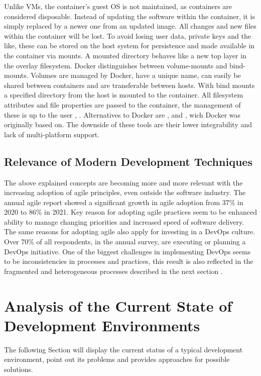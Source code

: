 \documentclass[12pt, a4paper]{article}
\begin{document}
        Unlike \ac{VM}s, the container's guest \ac{OS} is not maintained, as containers are considered disposable. Instead of updating the software within the container, it is simply replaced by a newer one from an updated image. All changes and new files within the container will be lost. To avoid losing user data, private keys and the like, these can be stored on the host system for persistence and made available in the container via mounts. A mounted directory behaves like a new top layer in the overlay filesystem. Docker distinguishes between volume-mounts and bind-mounts. Volumes are managed by Docker, have a unique name, can easily be shared between containers and are transferable between hosts. With bind mounts a specified directory from the host is mounted to the container. All filesystem attributes and file properties are passed to the container, the management of these is up to the user \cite{docker2020}, \cite{dockerdocs}.\newline
        Alternatives to Docker are ,  and , wich Docker was originally based on. The downside of these tools are their lower integrability and lack of multi-platform support.

    \subsection{Relevance of Modern Development Techniques}
    The above explained concepts are becoming more and more relevant with the increasing adoption of agile principles, even outside the software industry. The annual agile report showed a significant growth in agile adoption from 37\% in 2020 to 86\% in 2021. Key reason for adopting agile practices seem to be enhanced ability to manage changing priorities and increased speed of software delivery. The same reasons for adopting agile also apply for investing in a DevOps culture. Over 70\% of all respondents, in the annual survey, are executing or planning a DevOps initiative. One of the biggest challenges in implementing DevOps seems to be inconsistencies in processes and practices, this result is also reflected in the fragmented and heterogeneous processes described in the next section \cite{agilereport2021}.

\section{Analysis of the Current State of Development Environments}\label{sec::problem}
The following Section will display the current status of a typical development environment, point out its problems and provides approaches for possible solutions.
\end{document}
